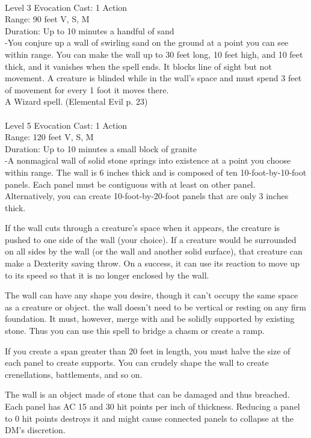 \documentclass[10pt,twocolumn]{report}
\begin{document}
 \\
Level 3 \quad Evocation \quad Cast: 1 Action\\
Range: 90 feet \quad V, S, M\\
Duration: Up to 10 minutes \quad a handful of sand\\
-You conjure up a wall of swirling sand on the ground at a point you can see within range. You can make the wall up to 30 feet long, 10 feet high, and 10 feet thick, and it vanishes when the spell ends. It blocks line of sight but not movement. A creature is blinded while in the wall’s space and must spend 3 feet of movement for every 1 foot it moves there.\\
A Wizard spell. (Elemental Evil p. 23) \\


 \\
Level 5 \quad Evocation \quad Cast: 1 Action\\
Range: 120 feet \quad V, S, M\\
Duration: Up to 10 minutes \quad a small block of granite\\
-A nonmagical wall of solid stone springs into existence at a point you choose within range.
The wall is 6 inches thick and is composed of ten 10-foot-by-10-foot panels. Each panel must be contiguous with at least on other panel. Alternatively, you can create 10-foot-by-20-foot panels that are only 3 inches thick.

If the wall cuts through a creature’s space when it appears, the creature is pushed to one side of the wall (your choice). If a creature would be surrounded on all sides by the wall (or the wall and another solid surface), that creature can make a Dexterity saving throw. On a success, it can use its reaction to move up to its speed so that it is no longer enclosed by the wall.

The wall can have any shape you desire, though it can’t occupy the same space as a creature or object. the wall doesn’t need to be vertical or resting on any firm foundation. It must, however, merge with and be solidly supported by existing stone. Thus you can use this spell to bridge a chasm or create a ramp.

If you create a span greater than 20 feet in length, you must halve the size of each panel to create supports. You can crudely shape the wall to create crenellations, battlements, and so on.

The wall is an object made of stone that can be damaged and thus breached. Each panel has AC 15 and 30 hit points per inch of thickness. Reducing a panel to 0 hit points destroys it and might cause connected panels to collapse at the DM’s discretion.
\end{document}
